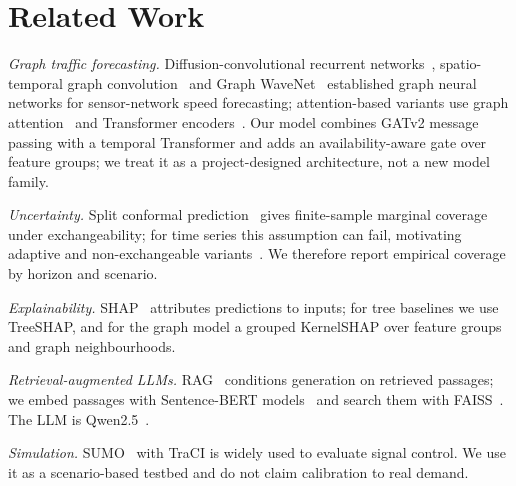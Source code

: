 \section{Related Work}
\textit{Graph traffic forecasting.} Diffusion-convolutional recurrent networks~\cite{li2018dcrnn}, spatio-temporal graph
convolution~\cite{yu2018stgcn} and Graph WaveNet~\cite{wu2019graphwavenet} established graph neural networks for
sensor-network speed forecasting; attention-based variants use graph attention~\cite{brody2022gatv2} and Transformer
encoders~\cite{vaswani2017attention}. Our model combines GATv2 message passing with a temporal Transformer and adds an
availability-aware gate over feature groups; we treat it as a project-designed architecture, not a new model family.

\textit{Uncertainty.} Split conformal prediction~\cite{vovk2005algorithmic,angelopoulos2021gentle} gives finite-sample
marginal coverage under exchangeability; for time series this assumption can fail, motivating adaptive and
non-exchangeable variants~\cite{barber2023beyond,xu2021enbpi}. We therefore report empirical coverage by horizon and
scenario.

\textit{Explainability.} SHAP~\cite{lundberg2017shap} attributes predictions to inputs; for tree baselines we use
TreeSHAP, and for the graph model a grouped KernelSHAP over feature groups and graph neighbourhoods.

\textit{Retrieval-augmented LLMs.} RAG~\cite{lewis2020rag} conditions generation on retrieved passages; we embed passages
with Sentence-BERT models~\cite{reimers2019sbert} and search them with FAISS~\cite{johnson2019faiss}. The LLM is
Qwen2.5~\cite{qwen2025qwen25}.

\textit{Simulation.} SUMO~\cite{lopez2018sumo} with TraCI is widely used to evaluate signal control. We use it as a
scenario-based testbed and do not claim calibration to real demand.
